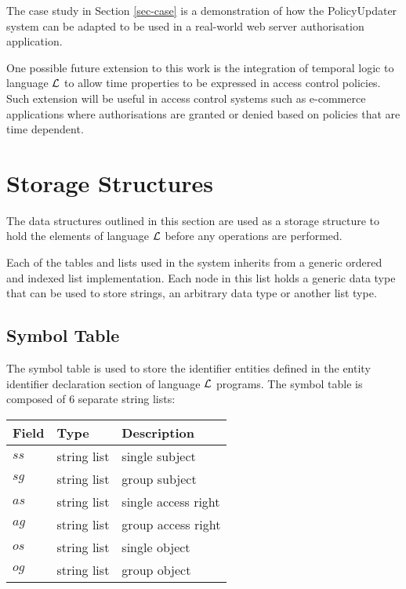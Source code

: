 \documentclass[global,twocolumn,draft]{svjour}
\makeatletter
\newenvironment{vquote}
  {\begin{list}{}{\leftmargin 1em}\item[]}
  {\end{list}}
\newcommand{\vappsection}[1]{
  \renewcommand{\@seccntformat}[1]{
    \appendixname\hspace{0.5em}\csname the##1\endcsname \hspace{1em}
  }
  \section{#1}
  \renewcommand{\@seccntformat}[1]{
    \csname the##1\endcsname\hspace{1em}
  }
}
\makeatother
\begin{document}
    The case study in Section \ref{sec-case} is a demonstration of how the
    PolicyUpdater system can be adapted to be used in a real-world web server
    authorisation application.

    One possible future extension to this work is the integration of temporal
    logic to language ${\cal L}$ to allow time properties to be expressed in
    access control policies. Such extension will be useful in access control
    systems such as e-commerce applications where authorisations are granted
    or denied based on policies that are time dependent.

  \appendix

  \vappsection{Storage Structures}

    \label{app-store}

    The data structures outlined in this section are used as a storage
    structure to hold the elements of language ${\cal L}$ before any
    operations are performed.

    Each of the tables and lists used in the system inherits from a generic
    ordered and indexed list implementation. Each node in this list holds a
    generic data type that can be used to store strings, an arbitrary data
    type or another list type.

    \subsection{Symbol Table}

      The symbol table is used to store the identifier entities defined in
      the entity identifier declaration section of language ${\cal L}$
      programs. The symbol table is composed of 6 separate string lists:

      \begin{vquote}
        \begin{tabular}[t]{|l|l|l|}
          \hline
          \textbf{Field} & \textbf{Type} & \textbf{Description} \\
          \hline
          $ss$ & string list & single subject \\
          \hline
          $sg$ & string list & group subject \\
          \hline
          $as$ & string list & single access right \\
          \hline
          $ag$ & string list & group access right \\
          \hline
          $os$ & string list & single object \\
          \hline
          $og$ & string list & group object \\
          \hline
        \end{tabular}
      \end{vquote}
\end{document}
